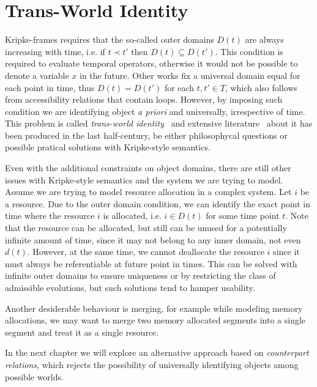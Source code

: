 \section{Trans-World Identity}

Kripke-frames requires that the so-called outer domains $D(t)$ are always increasing with time, i.e. if $t \prec t'$
then $D(t) \subseteq D(t')$. This condition is required to evaluate temporal operators, otherwise it would not be
possible to denote a variable $x$ in the future. Other works fix a universal domain equal for each point in time, thus
$D(t) = D(t')$ for each $t, t' \in T$, which also follows from accessibility relations that contain loops.  However, by
imposing such condition we are identifying object \emph{a priori} and universally, irrespective of time. This problem is
called \emph{trans-world identity}~\cite{lewis_counterpart_1968,lewis_plurality_2001} and extensive
literature~\cite{belardinelli_quantified_2021,plantinga_transworld_1978,kripke_naming_1998} about it has been produced
in the last half-century, be either philosophycal questions or possible pratical solutions with Kripke-style semantics.

Even with the additional constraints on object domains, there are still other issues with Kripke-style semantics and the
system we are trying to model. Assume we are trying to model resource allocation in a complex system. Let $i$ be a
resource. Due to the outer domain condition, we can identify the exact point in time where the resource $i$ is
allocated, i.e. $i \in D(t)$ for some time point $t$. Note that the resource can be allocated, but still can be unused
for a potentially infinite amount of time, since it may not belong to any inner domain, not even $d(t)$. However, at the
same time, we cannot deallocate the resource $i$ since it must always be referentiable at future point in times. This
can be solved with infinite outer domains to ensure uniqueness or by restricting the class of admissible evolutions, but
such solutions tend to hamper usability.

Another desiderable behaviour is merging, for example while modeling memory allocations, we may want to merge two memory
allocated segments into a single segment and treat it as a single resource.

In the next chapter we will explore an alternative approach based on \emph{counterpart relations}, which rejects the
possibility of universally identifying objects among possible worlds.
